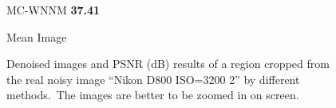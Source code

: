 \begin{figure}
{\begin{minipage}[t]{0.19\textwidth}
{\footnotesize MC-WNNM \textbf{37.41}}
\end{minipage}
\begin{minipage}[t]{0.19\textwidth}
\centering
{}
{\footnotesize Mean Image }
\end{minipage}
}
    \caption{Denoised images and PSNR (dB) results of a region cropped from the real noisy image ``Nikon D800 ISO=3200 2'' \cite{crosschannel2016} by different methods.\ The images are better to be zoomed in on screen.}
    \label{fig4-16}
\end{figure}



